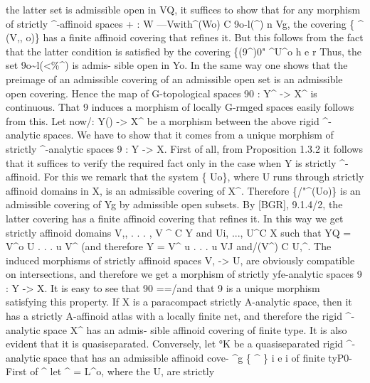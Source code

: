 \documentclass[
  10pt,
]{article}
\newenvironment{Shaded}{}{}
\newcommand{\NormalTok}[1]{#1}
\begin{document}
\begin{Shaded}
\begin{Highlighting}[]
\NormalTok{the latter set is admissible open in VQ, it suffices to show that for any morphism of}
\NormalTok{strictly \^{}{-}affinoid spaces + : W —Vwith\^{}(Wo) C 9o{-}l(\^{}) n Vg, the covering \{ \^{} \textquotesingle{}(V,, o)\}}
\NormalTok{has a finite affinoid covering that refines it. But this follows from the fact that the latter}
\NormalTok{condition is satisfied by the covering \{(9\^{})0" \^{}U\^{}o h e r Thus, the set 9o\textasciitilde{}l(\textless{}\%\^{}) is admis{-}}
\NormalTok{sible open in Yo. In the same way one shows that the preimage of an admissible covering}
\NormalTok{of an admissible open set is an admissible open covering. Hence the map of G{-}topological}
\NormalTok{spaces 90 : Y\^{} {-}\textgreater{} X\^{} is continuous. That 9 induces a morphism of locally G{-}rmged}
\NormalTok{spaces easily follows from this.}
\NormalTok{       Let now/: Y() {-}\textgreater{} X\^{} be a morphism between the above rigid \^{}{-}analytic spaces.}
\NormalTok{We have to show that it comes from a unique morphism of strictly \^{}{-}analytic spaces}
\NormalTok{9 : Y {-}\textgreater{} X. First of all, from Proposition 1.3.2 it follows that it suffices to verify the}
\NormalTok{required fact only in the case when Y is strictly \^{}{-}affinoid. For this we remark that the}
\NormalTok{system \{ Uo\}, where U runs through strictly affinoid domains in X, is an admissible}
\NormalTok{covering of X\^{}. Therefore \{/"\^{}(Uo)\} is an admissible covering of Yg by admissible open}
\NormalTok{subsets. By [BGR], 9.1.4/2, the latter covering has a finite affinoid covering that refines}
\NormalTok{it. In this way we get strictly affinoid domains V,, . . . , V \^{} C Y and Ui, ..., U\^{}C X}
\NormalTok{such that YQ = V\^{}o U . . . u V\^{} (and therefore Y = V\^{} u . . . u VJ and/(V\^{}) C U,\^{}.}
\NormalTok{The induced morphisms of strictly affinoid spaces V, {-}\textgreater{} U, are obviously compatible}
\NormalTok{on intersections, and therefore we get a morphism of strictly yfe{-}analytic spaces 9 : Y {-}\textgreater{} X.}
\NormalTok{It is easy to see that 90 ==/and that 9 is a unique morphism satisfying this property.}
\NormalTok{       If X is a paracompact strictly A{-}analytic space, then it has a strictly A{-}affinoid}
\NormalTok{atlas with a locally finite net, and therefore the rigid \^{}{-}analytic space X\^{} has an admis{-}}
\NormalTok{sible affinoid covering of finite type. It is also evident that it is quasiseparated. Conversely,}
\NormalTok{let °K be a quasiseparated rigid \^{}{-}analytic space that has an admissible affinoid cove{-}}
\NormalTok{\^{}g \{ \^{} \} i e i of finite tyP0{-} First of \^{} let \^{} = L\^{}o, where the U, are strictly}

\end{Highlighting}
\end{Shaded}
\end{document}
